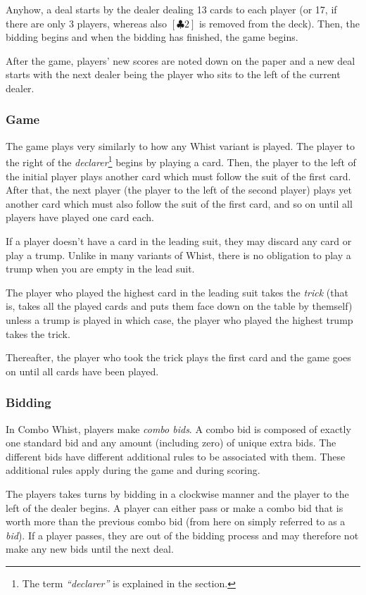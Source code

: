 \documentclass[a4paper]{article}
\begin{document}
		Anyhow, a deal starts by the dealer dealing 13 cards to each player (or 17, if there are only 3 players, whereas also $[\clubsuit2]$ is removed from the deck). Then, the bidding begins and when the bidding has finished, the game begins.
		
		After the game, players' new scores are noted down on the paper and a new deal starts with the next dealer being the player who sits to the left of the current dealer.
			\subsubsection{Game}
			The game plays very similarly to how any Whist variant is played. The player to the right of the \emph{declarer}\footnote{The term \emph{``declarer''} is explained in the \textit{} section.} begins by playing a card. Then, the player to the left of the initial player plays another card which must follow the suit of the first card. After that, the next player (the player to the left of the second player) plays yet another card which must also follow the suit of the first card, and so on until all players have played one card each.
			
			If a player doesn't have a card in the leading suit, they may discard any card or play a trump. Unlike in many variants of Whist, there is no obligation to play a trump when you are empty in the lead suit.
			
			The player who played the highest card in the leading suit takes the \emph{trick} (that is, takes all the played cards and puts them face down on the table by themself) unless a trump is played in which case, the player who played the highest trump takes the trick.
			
			Thereafter, the player who took the trick plays the first card and the game goes on until all cards have been played.
			
			\subsubsection{Bidding}
			\label{sec:bidding}
			In Combo Whist, players make \emph{combo bids}. A combo bid is composed of exactly one standard bid and any amount (including zero) of unique extra bids. The different bids have different additional rules to be associated with them. These additional rules apply during the game and during scoring.
			
			The players takes turns by bidding in a clockwise manner and the player to the left of the dealer begins. A player can either pass or make a combo bid that is worth more than the previous combo bid (from here on simply referred to as a \emph{bid}). If a player passes, they are out of the bidding process and may therefore not make any new bids until the next deal.
			
\end{document}

